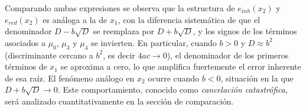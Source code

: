 Comparando ambas expresiones se observa que la estructura de $e_{inh}(x_2)$ y $e_{red}(x_2)$
es análoga a la de $x_1$, con la diferencia sistemática de que el denominador $D - b\sqrt{D}$
se reemplaza por $D + b\sqrt{D}$, y los signos de los términos asociados a $\mu_0$, $\mu_3$ y
$\mu_4$ se invierten. En particular, cuando $b > 0$ y $D \approx b^2$ (discriminante cercano a
$b^2$, es decir $4ac \to 0$), el denominador de los primeros términos de $x_1$ se aproxima a
cero, lo que amplifica fuertemente el error inherente de esa raíz. El fenómeno análogo en $x_2$
ocurre cuando $b < 0$, situación en la que $D + b\sqrt{D} \to 0$. Este comportamiento,
conocido como \textit{cancelación catastrófica}, será analizado cuantitativamente en la
sección de comparación.